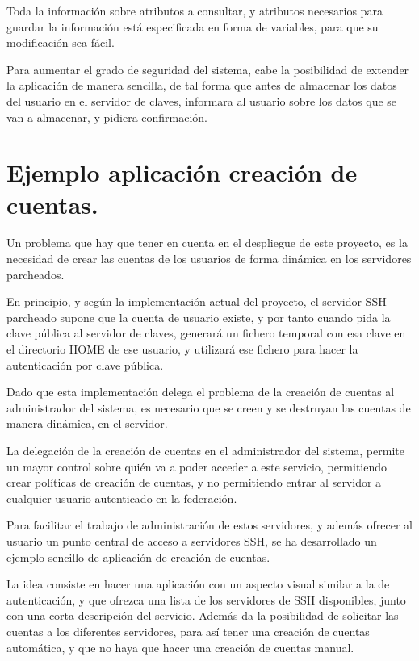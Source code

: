     Toda la información sobre atributos a consultar, y atributos necesarios
    para guardar la información está especificada en forma de variables,
    para que su modificación sea fácil.

    Para aumentar el grado de seguridad del sistema, cabe la posibilidad de
    extender la aplicación de manera sencilla, de tal forma que antes de
    almacenar los datos del usuario en el servidor de claves, informara al
    usuario sobre los datos que se van a almacenar, y pidiera confirmación.

    \section{Ejemplo aplicación creación de cuentas.}

    Un problema que hay que tener en cuenta en el despliegue de este
    proyecto, es la necesidad de crear las cuentas de los usuarios de forma
    dinámica en los servidores parcheados.

    En principio, y según la implementación actual del proyecto, el
    servidor SSH parcheado supone que la cuenta de usuario existe, y por
    tanto cuando pida la clave pública al servidor de claves, generará un
    fichero temporal con esa clave en el directorio HOME de ese usuario, y
    utilizará ese fichero para hacer la autenticación por clave pública.

    Dado que esta implementación delega el problema de la creación de
    cuentas al administrador del sistema, es necesario que se creen y se
    destruyan las cuentas de manera dinámica, en el servidor.

    La delegación de la creación de cuentas en el administrador del
    sistema, permite un mayor control sobre quién va a poder acceder a este
    servicio, permitiendo crear políticas de creación de cuentas, y no
    permitiendo entrar al servidor a cualquier usuario autenticado en la
    federación.

    Para facilitar el trabajo de administración de estos servidores, y
    además ofrecer al usuario un punto central de acceso a servidores SSH,
    se ha desarrollado un ejemplo sencillo de aplicación de creación de
    cuentas.

    La idea consiste en hacer una aplicación con un aspecto visual similar
    a la de autenticación, y que ofrezca una lista de los servidores de SSH
    disponibles, junto con una corta descripción del servicio. Además da la
    posibilidad de solicitar las cuentas a los diferentes servidores, para
    así tener una creación de cuentas automática, y que no haya que hacer
    una creación de cuentas manual.

